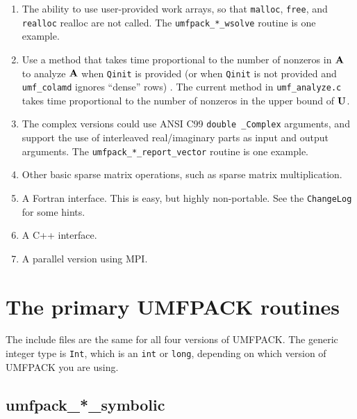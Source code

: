 \begin{enumerate}
\item The ability to use user-provided work arrays, so that {\tt malloc},
    {\tt free}, and {\tt realloc} realloc are not called.  The
    {\tt umfpack\_*\_wsolve} routine is one example.

\item Use a method that takes time proportional to the number of nonzeros in
    ${\bf{A}}$ to analyze ${\bf{A}}$ when {\tt Qinit} is provided (or when
    {\tt Qinit} is not provided and {\tt umf\_colamd} ignores ``dense'' rows)
    \cite{GilbertNgPeyton94}.  The current method in {\tt umf\_analyze.c} takes
    time proportional to the number of nonzeros in the upper bound of ${\bf{U}}$.

\item The complex versions could use ANSI C99 {\tt double \_Complex} arguments,
    and support the use of interleaved real/imaginary parts as input and output
    arguments.  The \newline
    {\tt umfpack\_*\_report\_vector} routine is one example.

\item Other basic sparse matrix operations, such as sparse matrix
    multiplication.

\item A Fortran interface.  This is easy, but highly non-portable.
    See the {\tt ChangeLog} for some hints.

\item A C++ interface.

\item A parallel version using MPI.

\end{enumerate}


\newpage
\section{The primary UMFPACK routines}
\label{Primary}

The include files are the same for all four versions of
UMFPACK.  The generic integer type is {\tt Int}, which is an {\tt int} or
{\tt long}, depending on which version of UMFPACK you are using.  

\subsection{umfpack\_*\_symbolic}

